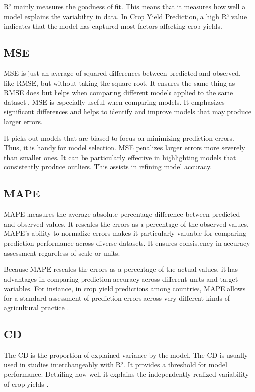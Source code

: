 \documentclass[conference]{IEEEtran}
\begin{document}
R² mainly measures the goodness of fit. This means that it measures how well a model explains the variability in data. In Crop Yield Prediction, a high R² value indicates that the model has captured most factors affecting crop yields. 

\subsection{MSE}\label{AA}
MSE is just an average of squared differences between predicted and observed, like RMSE, but without taking the square root. It ensures the same thing as RMSE does but helps when comparing different models applied to the same dataset \cite{b80}. MSE is especially useful when comparing models. It emphasizes significant differences and helps to identify and improve models that may produce larger errors.

It picks out models that are biased to focus on minimizing prediction errors. Thus, it is handy for model selection. MSE penalizes larger errors more severely than smaller ones. It can be particularly effective in highlighting models that consistently produce outliers. This assists in refining model accuracy.

\subsection{MAPE}\label{AA}
MAPE measures the average absolute percentage difference between predicted and observed values. It rescales the errors as a percentage of the observed values. MAPE's ability to normalize errors makes it particularly valuable for comparing prediction performance across diverse datasets. It ensures consistency in accuracy assessment regardless of scale or units.

Because MAPE rescales the errors as a percentage of the actual values, it has advantages in comparing prediction accuracy across different units and target variables. For instance, in crop yield predictions among countries, MAPE allows for a standard assessment of prediction errors across very different kinds of agricultural practice \cite{b81}.

\subsection{CD}\label{AA}
The CD is the proportion of explained variance by the model. The CD is usually used in studies interchangeably with R². It provides a threshold for model performance. Detailing how well it explains the independently realized variability of crop yields \cite{b82}.
\end{document}
